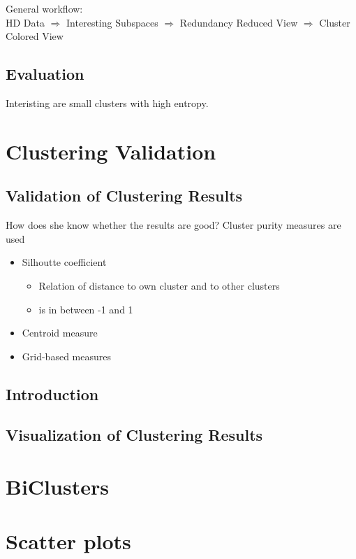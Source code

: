 \documentclass[11pt,ngerman]{article}
\begin{document}
General workflow: \\
HD Data $\Rightarrow$ Interesting Subspaces $\Rightarrow$ Redundancy Reduced View $\Rightarrow$ Cluster Colored View
\subsection{ Evaluation}
Interisting are small clusters with high entropy.


\section{Clustering Validation}

\subsection{Validation of Clustering Results}
How does she know whether the results are good?
Cluster purity measures are used
\begin{itemize}
\item Silhoutte coefficient
	\begin{itemize}
	\item Relation of distance to own cluster and to other clusters
	\item is in between -1 and 1 
	\end{itemize}
\item Centroid measure
\item Grid-based measures
\end{itemize}

\subsection{Introduction}
\subsection{Visualization of Clustering Results}


\section{BiClusters}


\section{Scatter plots}
\end{document}
